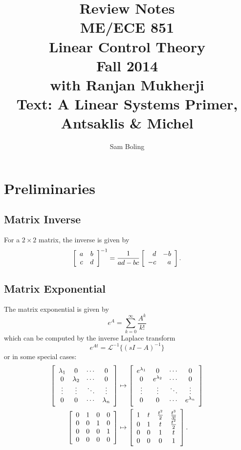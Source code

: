 \documentclass{report}
\author{Sam Boling}
\title{
  Review Notes \\
  ME/ECE 851 \\
  Linear Control Theory \\
  Fall 2014 \\
  with Ranjan Mukherji \\
  Text: A Linear Systems Primer, Antsaklis \& Michel
}
\begin{document}
\maketitle
\tableofcontents

\section{Preliminaries}

\subsection{Matrix Inverse}
For a $2 \times 2$ matrix, the inverse is given by
$$
\left[\begin{array}{c c}
  a & b \\
  c & d
\end{array}\right]^{-1}
=
\frac{1}{ad - bc}
\left[\begin{array}{r r}
   d & -b \\
  -c &  a
\end{array}\right].
$$

\subsection{Matrix Exponential}
The matrix exponential is given by
$$
e^{A} = \sum_{k=0}^\infty \frac{A^k}{k!}
$$
which can be computed by the inverse Laplace transform
$$
e^{At} = \mathcal{L}^{-1}\{(sI - A)^{-1}\}
$$
or in some special cases:
\begin{align*}
\left[\begin{array}{c c c c}
  \lambda_1 & 0          & \cdots & 0      \\
  0         & \lambda_2  & \cdots & 0      \\
  \vdots    & \vdots     & \ddots & \vdots \\
  0         & 0          & \cdots & \lambda_n
\end{array}\right]
& \mapsto
\left[\begin{array}{c c c c}
  e^{\lambda_1} & 0           & \cdots & 0      \\
  0           & e^{\lambda_2} & \cdots & 0      \\
  \vdots      & \vdots      & \ddots & \vdots \\
  0           & 0           & \cdots & e^{\lambda_n}
\end{array}\right] \\
\left[\begin{array}{c c c c c}
  0 & 1 & 0 & 0 \\
  0 & 0 & 1 & 0 \\
  0 & 0 & 0 & 1 \\
  0 & 0 & 0 & 0
\end{array}\right]
& \mapsto
\left[\begin{array}{c c c c}
  1 & t & \frac{t^2}{2} & \frac{t^3}{3!} \\
  0 & 1 & t             & \frac{t^2}{2}  \\
  0 & 0 & 1             & t              \\
  0 & 0 & 0             & 1
\end{array}\right].
\end{align*}
\end{document}
